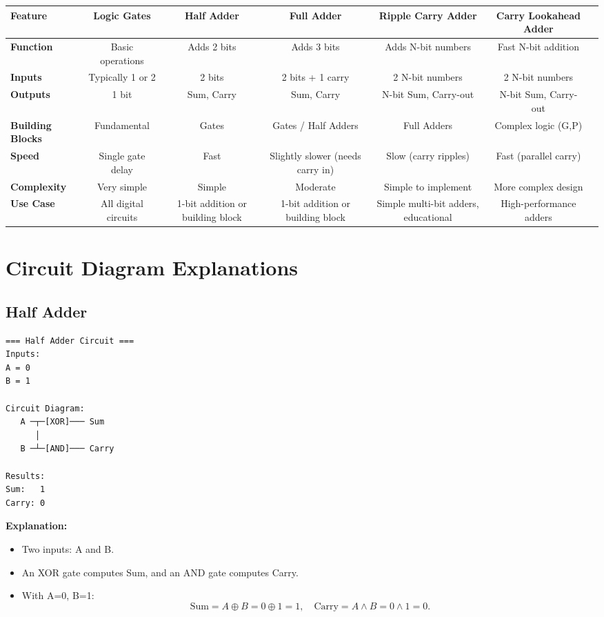 \documentclass[12pt]{article}
\begin{document}
\begin{center}
\renewcommand{\arraystretch}{1.2}
\begin{tabular}{@{}lcccccc@{}}
\toprule
\textbf{Feature} & \textbf{Logic Gates} & \textbf{Half Adder} & \textbf{Full Adder} & \textbf{Ripple Carry Adder} & \textbf{Carry Lookahead Adder} \\
\midrule
\textbf{Function}    
 & Basic operations 
 & Adds 2 bits 
 & Adds 3 bits 
 & Adds N-bit numbers 
 & Fast N-bit addition \\
\textbf{Inputs}      
 & Typically 1 or 2 
 & 2 bits 
 & 2 bits + 1 carry 
 & 2 N-bit numbers 
 & 2 N-bit numbers \\
\textbf{Outputs}     
 & 1 bit 
 & Sum, Carry 
 & Sum, Carry 
 & N-bit Sum, Carry-out 
 & N-bit Sum, Carry-out \\
\textbf{Building Blocks} 
 & Fundamental 
 & Gates 
 & Gates / Half Adders 
 & Full Adders 
 & Complex logic (G,P) \\
\textbf{Speed}       
 & Single gate delay 
 & Fast 
 & Slightly slower (needs carry in) 
 & Slow (carry ripples) 
 & Fast (parallel carry) \\
\textbf{Complexity}  
 & Very simple 
 & Simple 
 & Moderate 
 & Simple to implement 
 & More complex design \\
\textbf{Use Case}    
 & All digital circuits 
 & 1-bit addition or building block 
 & 1-bit addition or building block 
 & Simple multi-bit adders, educational 
 & High-performance adders \\
\bottomrule
\end{tabular}
\end{center}

\section{Circuit Diagram Explanations}

\subsection{Half Adder}
\begin{verbatim}
=== Half Adder Circuit ===
Inputs:
A = 0
B = 1

Circuit Diagram:
   A ─┬─[XOR]─── Sum
      │
   B ─┴─[AND]─── Carry

Results:
Sum:   1
Carry: 0
\end{verbatim}
\noindent \textbf{Explanation:}
\begin{itemize}
    \item Two inputs: A and B.
    \item An XOR gate computes Sum, and an AND gate computes Carry.
    \item With A=0, B=1:
      \[
        \text{Sum} = A \oplus B = 0 \oplus 1 = 1, \quad
        \text{Carry} = A \land B = 0 \land 1 = 0.
      \]
\end{itemize}
\end{document}
